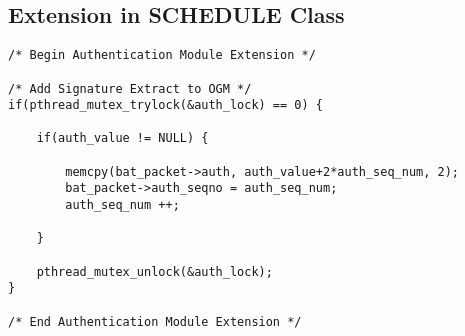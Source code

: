 \subsection{Extension in SCHEDULE Class}\label{code:ext_schedule}
\begin{lstlisting}[frame=tb]
/* Begin Authentication Module Extension */

/* Add Signature Extract to OGM */
if(pthread_mutex_trylock(&auth_lock) == 0) {

	if(auth_value != NULL) {

		memcpy(bat_packet->auth, auth_value+2*auth_seq_num, 2);
		bat_packet->auth_seqno = auth_seq_num;
		auth_seq_num ++;

	}

	pthread_mutex_unlock(&auth_lock);
}

/* End Authentication Module Extension */
\end{lstlisting}

%
%
%
%
%
%
%
%
%
%
%
%
%
%
